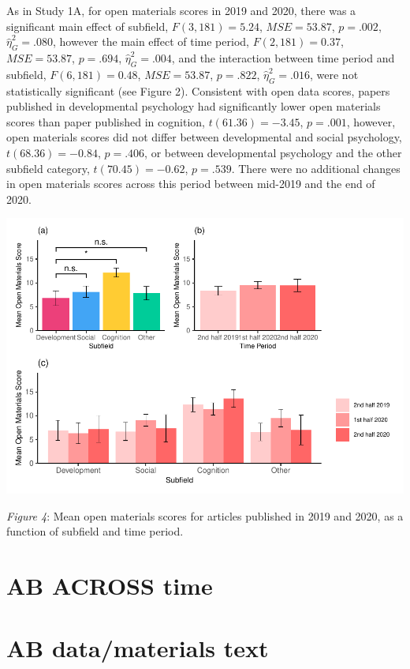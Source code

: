 \documentclass[
  english,
  man]{apa6}
\begin{document}
As in Study 1A, for open materials scores in 2019 and 2020, there was a significant main effect of subfield, \(F(3, 181) = 5.24\), \(\mathit{MSE} = 53.87\), \(p = .002\), \(\hat{\eta}^2_G = .080\), however the main effect of time period, \(F(2, 181) = 0.37\), \(\mathit{MSE} = 53.87\), \(p = .694\), \(\hat{\eta}^2_G = .004\), and the interaction between time period and subfield, \(F(6, 181) = 0.48\), \(\mathit{MSE} = 53.87\), \(p = .822\), \(\hat{\eta}^2_G = .016\), were not statistically significant (see Figure 2). Consistent with open data scores, papers published in developmental psychology had significantly lower open materials scores than paper published in cognition, \(t(61.36) = -3.45\), \(p = .001\), however, open materials scores did not differ between developmental and social psychology, \(t(68.36) = -0.84\), \(p = .406\), or between developmental psychology and the other subfield category, \(t(70.45) = -0.62\), \(p = .539\). There were no additional changes in open materials scores across this period between mid-2019 and the end of 2020.

\includegraphics{icd_special_issue_files/figure-latex/1B-m-plots-1.pdf}

\emph{Figure 4}: Mean open materials scores for articles published in 2019 and 2020, as a function of subfield and time period.

\hypertarget{ab-across-time}{%
\section{AB ACROSS time}\label{ab-across-time}}

\hypertarget{ab-datamaterials-text}{%
\section{AB data/materials text}\label{ab-datamaterials-text}}
\end{document}
